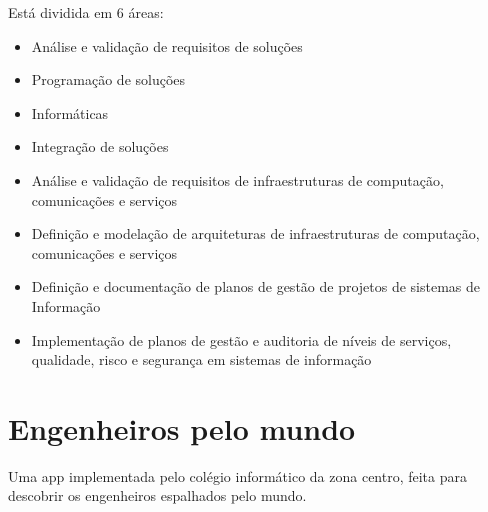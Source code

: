 Está dividida em 6 áreas:

\begin{itemize}
    \item Análise e validação de requisitos de soluções
    \item Programação de soluções
    \item Informáticas
    \item Integração de soluções
    \item Análise e validação de requisitos de infraestruturas de computação, comunicações e serviços
    \item Definição e modelação de arquiteturas de infraestruturas de computação, comunicações e serviços
    \item Definição e documentação de planos de gestão de projetos de sistemas de Informação
    \item Implementação de planos de gestão e auditoria de níveis de serviços, qualidade, risco e segurança em sistemas de informação
\end{itemize}

\section{Engenheiros pelo mundo}

Uma app implementada pelo colégio informático da zona centro, feita para descobrir os engenheiros espalhados pelo mundo.

